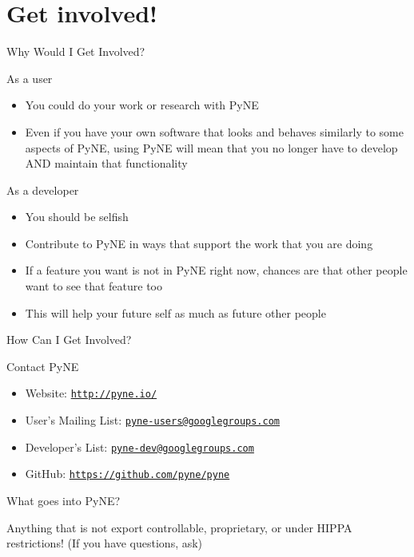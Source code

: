 \documentclass[xcolor=x11names,compress]{beamer}
\renewcommand{\(}{\begin{columns}}
\renewcommand{\)}{\end{columns}}
\newcommand{\<}[1]{\begin{column}{#1}}
\renewcommand{\>}{\end{column}}
\begin{document}
\section{Get involved!}
\begin{frame}{Why Would I Get Involved?}

    As a \textcolor{dgreen}{user} 
    \begin{itemize}
    \item You could do your work or research with PyNE
    \item Even if you have your own software that looks and behaves similarly to some aspects of PyNE, using PyNE will mean that you no longer have to develop AND maintain that functionality
    \end{itemize}        

    \vspace*{1 em}
    As a \textcolor{dgreen}{developer} 
    \begin{itemize}
    \item You should be selfish
    \item Contribute to PyNE in ways that support the work that you are doing
    \item If a feature you want is not in PyNE right now, chances are that other 
    people want to see that feature too
    \item This will help your future self as much as future other people
    \end{itemize}    

\end{frame}

\begin{frame}{How Can I Get Involved?}

    \textcolor{dgreen}{Contact PyNE}
    \begin{itemize}
    \item Website: \href{http://pyne.io/}{\texttt{http://pyne.io/}}
    \item User's Mailing List: \href{pyne-users@googlegroups.com}
    {\texttt{pyne-users@googlegroups.com}}
    \item Developer's List: \href{pyne-dev@googlegroups.com}
    {\texttt{pyne-dev@googlegroups.com}}
    \item GitHub: \href{https://github.com/pyne/pyne}
    {\texttt{https://github.com/pyne/pyne}}
    \end{itemize}
    
    \vspace*{2 em}
    \textcolor{dgreen}{What goes into PyNE?}

    Anything that is not export controllable, proprietary, 
    or under HIPPA restrictions!  (If you have questions, ask)
  
\end{frame}
\end{document}
